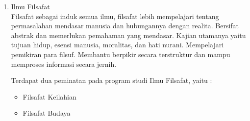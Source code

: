 	\begin{enumerate}
		\item Ilmu Filsafat\\
			 Filsafat sebagai induk semua ilmu, filsafat lebih mempelajari tentang permasalahan mendasar manusia dan hubungannya dengan realita. Bersifat abstrak dan memerlukan pemahaman yang mendasar. Kajian utamanya yaitu tujuan hidup, esensi manusia, moralitas, dan hati nurani. Mempelajari pemikiran para filsuf. Membantu berpikir secara terstruktur dan mampu memproses informasi secara jernih.
			
			Terdapat dua peminatan pada program studi Ilmu Filsafat, yaitu :
			
			\begin{itemize}
				\item Filsafat Keilahian
				\item Filsafat Budaya
			\end{itemize}\leavevmode
			
	\end{enumerate}\leavevmode
	
